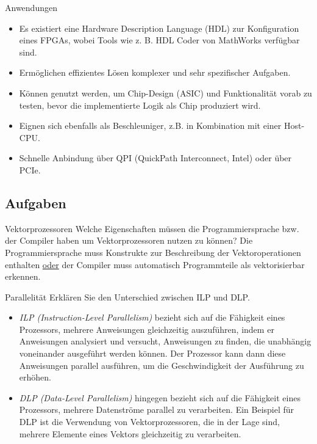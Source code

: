 \begin{defi}{Anwendungen}
    \begin{itemize}
        \item Es existiert eine Hardware Description Language (HDL) zur Konfiguration eines FPGAs, wobei Tools wie z. B. HDL Coder von MathWorks verfügbar sind.
        \item Ermöglichen effizientes Lösen komplexer und sehr spezifischer Aufgaben.
        \item Können genutzt werden, um Chip-Design (ASIC) und Funktionalität vorab zu testen, bevor die implementierte Logik als Chip produziert wird.
        \item Eignen sich ebenfalls als Beschleuniger, z.B. in Kombination mit einer Host-CPU.
        \item Schnelle Anbindung über QPI (QuickPath Interconnect, Intel) oder über PCIe.
    \end{itemize}
\end{defi}

\subsection{Aufgaben}

\begin{aufgabe}{Vektorprozessoren}
    Welche Eigenschaften müssen die Programmiersprache bzw. der Compiler haben um Vektorprozessoren nutzen zu können?
    \tcblower
    Die Programmiersprache muss Konstrukte zur Beschreibung der Vektoroperationen enthalten
    \underline{oder} der Compiler muss automatisch Programmteile als vektorisierbar erkennen.
\end{aufgabe}

\begin{aufgabe}{Parallelität}
    Erklären Sie den Unterschied zwischen ILP und DLP.
    \tcblower
    \begin{itemize}
        \item \emph{ILP (Instruction-Level Parallelism)} bezieht sich auf die Fähigkeit eines Prozessors,
              mehrere Anweisungen gleichzeitig auszuführen,
              indem er Anweisungen analysiert und versucht,
              Anweisungen zu finden,
              die unabhängig voneinander ausgeführt werden können.
              Der Prozessor kann dann diese Anweisungen parallel ausführen,
              um die Geschwindigkeit der Ausführung zu erhöhen.
        \item \emph{DLP (Data-Level Parallelism)} hingegen bezieht sich auf die Fähigkeit eines Prozessors,
              mehrere Datenströme parallel zu verarbeiten.
              Ein Beispiel für DLP ist die Verwendung von Vektorprozessoren,
              die in der Lage sind,
              mehrere Elemente eines Vektors gleichzeitig zu verarbeiten.
    \end{itemize}
\end{aufgabe}

